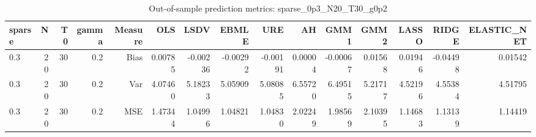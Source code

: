 \begin{table}[!htbp]\centering
\caption{Out-of-sample prediction metrics: sparse_0p3_N20_T30_g0p2}
\label{tab:table3_sparse_0p3_N20_T30_g0p2}
\begin{tabular}{lrrrrrrrrrrrrrr}
\hline
sparse & N & T0 & gamma & Measure & OLS & LSDV & EBMLE & URE & AH & GMM1 & GMM2 & LASSO & RIDGE & ELASTIC_NET \\
\hline
0.3 & 20 & 30 & 0.2 & Bias & 0.00785 & -0.00236 & -0.00292 & -0.00191 & 0.00004 & -0.00067 & 0.01568 & 0.01946 & -0.04498 & 0.01542 \\
0.3 & 20 & 30 & 0.2 & Var & 4.07460 & 5.18233 & 5.05909 & 5.08085 & 6.55720 & 6.49515 & 5.21717 & 4.52196 & 4.55384 & 4.51795 \\
0.3 & 20 & 30 & 0.2 & MSE & 1.47344 & 1.04996 & 1.04821 & 1.04830 & 2.02249 & 1.98569 & 2.10395 & 1.14683 & 1.13139 & 1.14419 \\
\hline
\end{tabular}
\end{table}

